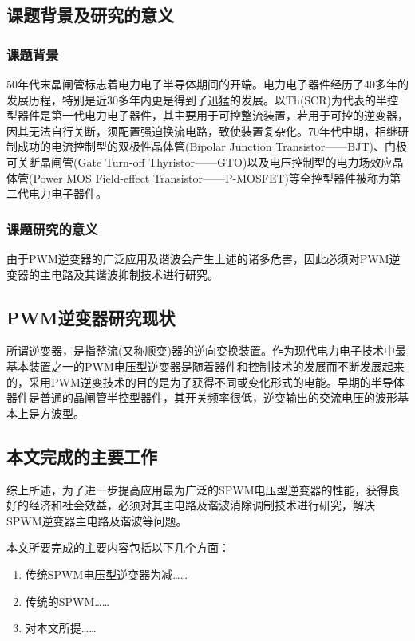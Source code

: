 \neepuprolegomenon%
\subsection{课题背景及研究的意义}%
\bodystyle
\subsubsection{课题背景}
50年代末晶闸管标志着电力电子半导体期间的开端。电力电子器件经历了40多年的发展历程，特别是近30多年内更是得到了迅猛的发展。以Th(SCR)为代表的半控型器件是第一代电力电子器件，其主要用于可控整流装置，若用于可控的逆变器，因其无法自行关断，须配置强迫换流电路，致使装置复杂化。70年代中期，相继研制成功的电流控制型的双极性晶体管(Bipolar Junction Transistor——BJT)、门极可关断晶闸管(Gate Turn-off Thyristor——GTO)以及电压控制型的电力场效应晶体管(Power MOS Field-effect Transistor——P-MOSFET)等全控型器件被称为第二代电力电子器件。\par

\subsubsection{课题研究的意义}
由于PWM逆变器的广泛应用及谐波会产生上述的诸多危害，因此必须对PWM逆变器的主电路及其谐波抑制技术进行研究。\par


\subsection{PWM逆变器研究现状}

所谓逆变器，是指整流(又称顺变)器的逆向变换装置。作为现代电力电子技术中最基本装置之一的PWM电压型逆变器是随着器件和控制技术的发展而不断发展起来的，采用PWM逆变技术的目的是为了获得不同或变化形式的电能。早期的半导体器件是普通的晶闸管半控型器件，其开关频率很低，逆变输出的交流电压的波形基本上是方波型。

\subsection{本文完成的主要工作}
综上所述，为了进一步提高应用最为广泛的SPWM电压型逆变器的性能，获得良好的经济和社会效益，必须对其主电路及谐波消除调制技术进行研究，解决SPWM逆变器主电路及谐波等问题。\par
本文所要完成的主要内容包括以下几个方面：

\begin{enumerate}[label=(\arabic*),topsep=0pt,itemsep=0pt,parsep=0pt,leftmargin=1.5cm]                                                                                                                                      
\item 传统SPWM电压型逆变器为减……                                                                                                                                            
\item 传统的SPWM…… 
\item 对本文所提……                                                                                                                                          
\end{enumerate}    